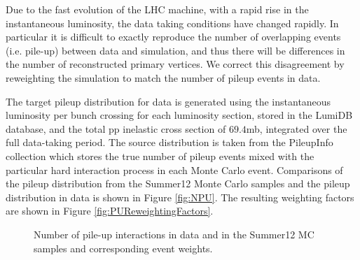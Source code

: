 Due to the fast evolution of the LHC machine, with a rapid rise in the
instantaneous luminosity, the data taking conditions have changed
rapidly.  In particular it is difficult to exactly reproduce the
number of overlapping events (i.e. pile-up) between data and
simulation, and thus there will be differences in the number of
reconstructed primary vertices. We correct this disagreement by
reweighting the simulation to match the number of pileup events in data. 

The target pileup distribution for data is generated using the instantaneous luminosity 
per bunch crossing for each luminosity section, stored in the LumiDB database, 
and the total pp inelastic cross section of $69.4$mb, integrated over the 
full data-taking period. 
The source distribution is taken from the PileupInfo
collection which stores the true number of pileup events mixed with the 
particular hard interaction process in each Monte Carlo event. Comparisons of the
pileup distribution from the Summer12 Monte Carlo samples and the pileup 
distribution in data is shown in Figure \ref{fig:NPU}. 
The resulting weighting factors are shown in Figure 
\ref{fig:PUReweightingFactors}. 

\begin{figure}[hbt]
\begin{center}
\caption{\label{fig:PU} Number of pile-up interactions in data and in the Summer12 MC samples and corresponding event weights.}
\end{center}
\end{figure}

